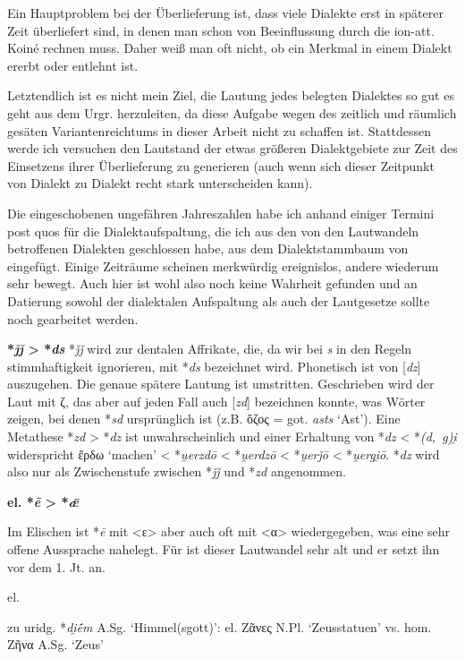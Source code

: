 \documentclass[12pt,a4paper,normalheadings]{scrartcl}
\newcounter{para}
\newcommand{\mypara}[1]{\vspace{1em}\par\noindent\refstepcounter{para}%
\textbf{\textsf{\thepara}}\enspace\textbf{#1}\quad}
\def\rek#1{\mbox{*\textit{#1}}}
\def\bel#1{\mbox{\textit{#1}}}
\begin{document}
Ein Hauptproblem bei der Überlieferung ist,
dass viele Dialekte erst in späterer Zeit überliefert sind,
in denen man schon von Beeinflussung durch die ion-att. Koiné rechnen muss.
Daher weiß man oft nicht,
ob ein Merkmal in einem Dialekt ererbt oder entlehnt ist.

Letztendlich ist es nicht mein Ziel,
die Lautung jedes belegten Dialektes so gut es geht aus dem Urgr. herzuleiten,
da diese Aufgabe wegen des zeitlich und räumlich gesäten Variantenreichtums
in dieser Arbeit nicht zu schaffen ist.
Stattdessen werde ich versuchen den Lautstand der etwas größeren Dialektgebiete
zur Zeit des Einsetzens ihrer Überlieferung zu generieren
(auch wenn sich dieser Zeitpunkt von Dialekt zu Dialekt recht stark unterscheiden kann).

Die eingeschobenen ungefähren Jahreszahlen habe ich anhand einiger Termini
post quos für die Dialektaufspaltung,
die ich aus den von den Lautwandeln betroffenen Dialekten geschlossen habe,
aus dem Dialektstammbaum von \textcite{bart_frueh} eingefügt.
Einige Zeiträume scheinen merkwürdig ereignislos, andere wiederum sehr bewegt.
Auch hier ist wohl also noch keine Wahrheit gefunden und
an Datierung sowohl der dialektalen Aufspaltung als auch der Lautgesetze
sollte noch gearbeitet werden.

\mypara{\rek{ǰǰ} > \rek{ds}}
\rek{ǰǰ} wird zur dentalen Affrikate, die,
da wir bei \bel{s} in den Regeln stimmhaftigkeit ignorieren,
mit \rek{ds} bezeichnet wird.
Phonetisch ist von [\bel{dz}] auszugehen.
Die genaue spätere Lautung ist umstritten.
Geschrieben wird der Laut mit ζ,
das aber auf jeden Fall auch [\bel{zd}] bezeichnen konnte,
was Wörter zeigen, bei denen \rek{sd} ursprünglich ist
(z.B. ὄζος = got. \bel{asts} `Ast').
Eine Metathese \rek{zd} > \rek{dz} ist unwahrscheinlich
und einer Erhaltung von \rek{dz} < \rek{(d, g)i̯} widerspricht
ἔρδω `machen' < \rek{u̯erzdō} < \rek{u̯erdzō} < \rek{u̯erǰō} < \rek{u̯ergi̯ō}.
\rek{dz} wird also nur als Zwischenstufe zwischen \rek{ǰǰ} und \rek{zd}
angenommen.

\lex{\rek{ǰǰ}}{\rek{ds}}
\label{ds}

\mypara{el. \rek{ē} > \rek{ǣ}}

Im Elischen ist \rek{ē} mit <ε> aber auch oft mit <α> wiedergegeben,
was eine sehr offene Aussprache nahelegt.
Für \textcite[89ff.]{bart_langvok} ist dieser Lautwandel sehr alt und er
setzt ihn vor dem 1. Jt. an.

\lex{\rek{ē}}{\bel{ǣ}} el.

zu uridg. \rek{di̯ḗm} A.Sg. `Himmel(sgott)':
el. Ζᾶνες N.Pl. `Zeusstatuen' vs. hom. Ζῆνα A.Sg. `Zeus'
\end{document}
